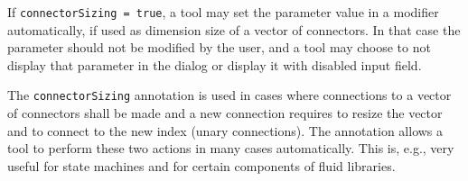 If \lstinline!connectorSizing = true!, a tool may set the parameter value in a modifier automatically, if used as dimension size of a vector of connectors.
In that case the parameter should not be modified by the user, and a tool may choose to not display that parameter in the dialog or display it with disabled input field.

\begin{nonnormative}
The \lstinline!connectorSizing! annotation is used in cases where connections to a vector of connectors shall be made and a new connection requires to resize the vector and to connect to the new index (unary connections).
The annotation allows a tool to perform these two actions in many cases automatically.
This is, e.g., very useful for state machines and for certain components of fluid libraries.
\end{nonnormative}

